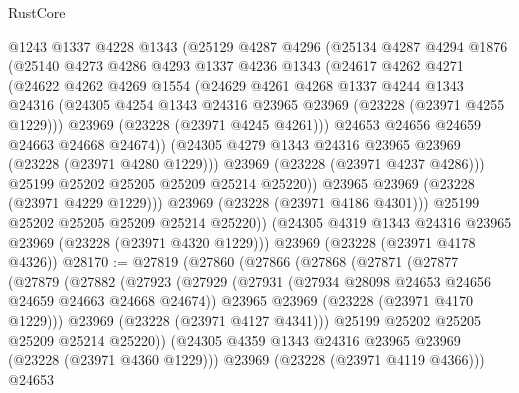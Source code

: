 \begin{lexlean}{RustCore}
\begin{coremodule}
            @1243
            @1337
            @4228
            @1343
            (@25129
              @4287
              @4296
              (@25134
                @4287
                @4294
                @1876
                (@25140
                  @4273
                  @4286
                  @4293
                  @1337
                  @4236
                  @1343
                  (@24617
                    @4262
                    @4271
                    (@24622
                      @4262
                      @4269
                      @1554
                      (@24629
                        @4261
                        @4268
                        @1337
                        @4244
                        @1343
                        @24316
                        (@24305 @4254 @1343 @24316 @23965 @23969 (@23228 (@23971 @4255 @1229)))
                        @23969
                        (@23228 (@23971 @4245 @4261)))
                      @24653
                      @24656
                      @24659
                      @24663
                      @24668
                      @24674))
                  (@24305 @4279 @1343 @24316 @23965 @23969 (@23228 (@23971 @4280 @1229)))
                  @23969
                  (@23228 (@23971 @4237 @4286)))
                @25199
                @25202
                @25205
                @25209
                @25214
                @25220))
            @23965
            @23969
            (@23228 (@23971 @4229 @1229)))
          @23969
          (@23228 (@23971 @4186 @4301)))
        @25199
        @25202
        @25205
        @25209
        @25214
        @25220))
    (@24305 @4319 @1343 @24316 @23965 @23969 (@23228 (@23971 @4320 @1229)))
    @23969
    (@23228 (@23971 @4178 @4326))
@28170 := @27819
    (@27860
      (@27866
        (@27868
          (@27871
            (@27877
              (@27879
                (@27882
                  (@27923
                    (@27929
                      (@27931 (@27934 @28098 @24653 @24656 @24659 @24663 @24668 @24674))
                      @23965
                      @23969
                      (@23228 (@23971 @4170 @1229)))
                    @23969
                    (@23228 (@23971 @4127 @4341)))
                  @25199
                  @25202
                  @25205
                  @25209
                  @25214
                  @25220))
              (@24305 @4359 @1343 @24316 @23965 @23969 (@23228 (@23971 @4360 @1229)))
              @23969
              (@23228 (@23971 @4119 @4366)))
            @24653

\end{coremodule}
\end{lexlean}
